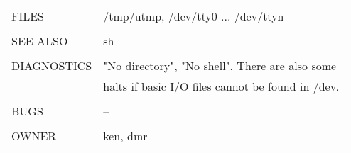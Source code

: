 \documentclass{article}
\newcommand*{\bibtitle}{Bibliography}
\newenvironment{manpage}{\ttfamily}{\par}
\begin{document}
\begin{manpage}
\begin{longtable}{ll}
		FILES & /tmp/utmp, /dev/tty0 ... /dev/ttyn\\\\
		
		SEE ALSO & sh\\\\
		
		DIAGNOSTICS & "No directory", "No shell". There are also some\\
		& halts if basic I/O files cannot be found in /dev.\\\\
		
		BUGS & --\\\\
		
		OWNER & ken, dmr
	\end{longtable}

\end{manpage}


\setlength{\baselineskip}{0pt} %

{\renewcommand*\MakeUppercase[1]{#1}%
\printbibliography[heading=bibintoc,title={\bibtitle}]}
\end{document}
